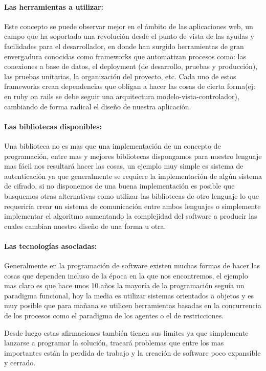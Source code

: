 \paragraph{Las herramientas a utilizar:}
Este concepto se puede observar mejor en el ámbito de las aplicaciones web, un campo que ha soportado una revolución desde el punto de vista de las ayudas y facilidades para el desarrollador, en donde han surgido herramientas de gran envergadura conocidas como frameworks que automatizan procesos como: las conexiones a base de datos, el deployment (de desarrollo, pruebas y producción), las pruebas unitarias, la organización del proyecto, etc. Cada uno de estos frameworks crean dependencias que obligan a hacer las cosas de cierta forma(ej: en ruby on rails se debe seguir una arquitectura modelo-vista-controlador), cambiando de forma radical el diseño de nuestra aplicación.

\paragraph{Las bibliotecas disponibles:}
Una biblioteca no es mas que una implementación de un concepto de programación, entre mas y mejores bibliotecas dispongamos para nuestro lenguaje mas fácil nos resultará hacer las cosas, un ejemplo muy simple es sistema de autenticación ya que generalmente se requiere la implementación de algún sistema de cifrado, si no disponemos de una buena implementación es posible que busquemos otras alternativas como utilizar las bibliotecas de otro lenguaje lo que requeriría crear un sistema de comunicación entre ambos lenguajes o simplemente implementar el algoritmo aumentando la complejidad del software a producir las cuales cambian nuestro diseño de una forma u otra.

\paragraph{Las tecnologías asociadas:}
Generalmente en la programación de software existen muchas formas de hacer las cosas que dependen incluso de la época en la que nos encontremos, el ejemplo mas claro es que hace unos 10 años la mayoría de la programación seguía un paradigma funcional, hoy la media es utilizar sistemas orientados a objetos y es muy posible que para mañana se utilicen herramientas basadas en la concurrencia de los procesos como el paradigma de los agentes o el de restricciones.


Desde luego estas afirmaciones también tienen sus limites ya que simplemente lanzarse a programar la solución, traeará problemas que entre los mas importantes están la perdida de trabajo y la creación de software poco expansible y cerrado.

